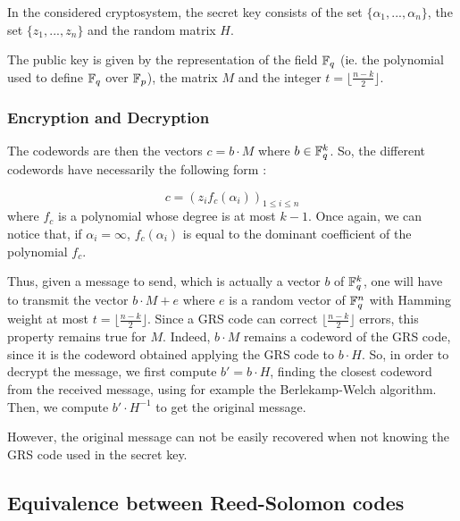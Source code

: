 \documentclass[a4paper]{article}
\begin{document}
In the considered cryptosystem, the secret key consists of the set $\{\alpha_1,... ,\alpha_n\}$, the set $\{z_1,... ,z_n\}$ and the random matrix $H$.

The public key is given by the representation of the field $\mathbb{F}_q$ (ie. the polynomial used to define $\mathbb{F}_q$ over $\mathbb{F}_p$), the matrix $M$ and the integer $t=\lfloor\frac{n-k}{2}\rfloor$.

\subsubsection{Encryption and Decryption}
The codewords are then the vectors $c=b\cdot M$ where $b\in\mathbb{F}_q^k$. So, the different codewords have necessarily the following form :

$$c=(z_if_c(\alpha_i))_{1\leq i\leq n}$$ where $f_c$ is a polynomial whose degree is at most $k-1$.
Once again, we can notice that, if $\alpha_i = \infty$, $f_c(\alpha_i)$ is equal to the dominant coefficient of the polynomial $f_c$.

Thus, given a message to send, which is actually a vector $b$ of $\mathbb{F}_q^k$, one will have to transmit the vector $b\cdot M + e$ where $e$ is a random vector of $\mathbb{F}_q^n$ with Hamming weight at most $t=\lfloor\frac{n-k}{2}\rfloor$.
Since a GRS code can correct $\lfloor\frac{n-k}{2}\rfloor$ errors, this property remains true for $M$. Indeed, $b\cdot M$ remains a codeword of the GRS code, since it is the codeword obtained applying the GRS code to $b\cdot H$.
So, in order to decrypt the message, we first compute $b'=b\cdot H$, finding the closest codeword from the received message, using for example the Berlekamp-Welch algorithm.
Then, we compute $b'\cdot H^{-1}$ to get the original message.

However, the original message can not be easily recovered when not knowing the GRS code used in the secret key.

\subsection{Equivalence between Reed-Solomon codes}
\end{document}
